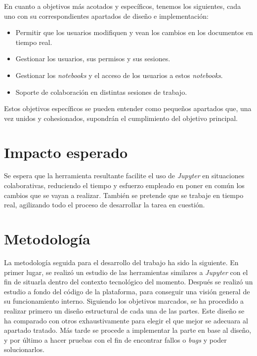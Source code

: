 \documentclass[11pt,spanish,listoffigures]{tfgetsinf}
\begin{document}
En cuanto a objetivos más acotados y específicos, tenemos los siguientes, cada uno con su correspondientes apartados de diseño e implementación:

\begin{itemize}

\item Permitir que los usuarios modifiquen y vean los cambios en los documentos en tiempo real.

\item Gestionar los usuarios, sus permisos y sus sesiones.

\item Gestionar los \textit{notebooks} y el acceso de los usuarios a estos \textit{notebooks}.

\item Soporte de colaboración en distintas sesiones de trabajo.

\end{itemize}

Estos objetivos específicos se pueden entender como pequeños apartados que, una vez unidos y cohesionados, supondrán el cumplimiento del objetivo principal.



\section{Impacto esperado}
\label{sec:impacto}

Se espera que la herramienta resultante facilite el uso de \textit{Jupyter} en situaciones colaborativas, reduciendo el tiempo y esfuerzo empleado en poner en común los cambios que se vayan a realizar. También se pretende que se trabaje en tiempo real, agilizando todo el proceso de desarrollar la tarea en cuestión. 



\section{Metodología}
\label{sec:metodologia}

La metodología seguida para el desarrollo del trabajo ha sido la siguiente. En primer lugar, se realizó un estudio de las herramientas similares a \textit{Jupyter} con el fin de situarla dentro del contexto tecnológico del momento. Después se realizó un estudio a fondo del código de la plataforma, para conseguir una visión general de su funcionamiento interno. Siguiendo los objetivos marcados, se ha procedido a realizar primero un diseño estructural de cada una de las partes. Este diseño se ha comparado con otros exhaustivamente para elegir el que mejor se adecuara al apartado tratado. Más tarde se procede a implementar la parte en base al diseño, y por último a hacer pruebas con el fin de encontrar fallos o \textit{\gls{bug}s} y poder solucionarlos.
\end{document}
